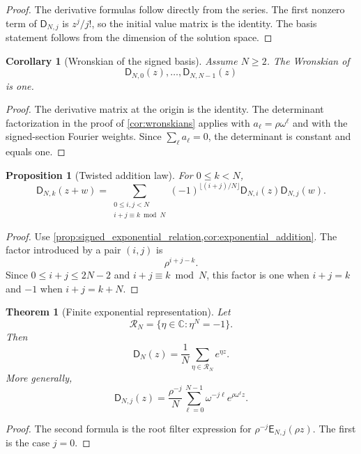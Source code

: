 \documentclass[11pt]{article}
\newtheorem{theorem}{Theorem}[section]
\newtheorem{proposition}[proposition]{Proposition}
\newtheorem{corollary}[corollary]{Corollary}
\theoremstyle{definition}
\theoremstyle{remark}
\newcommand{\CC}{\mathbb C}
\newcommand{\Rcal}{\mathcal R}
\newcommand{\Dfun}{\mathsf D}
\newcommand{\Efun}{\mathsf E}
\begin{document}
\begin{proof}
The derivative formulas follow directly from the series.  The first nonzero term of $\Dfun_{N,j}$ is $z^j/j!$, so the initial value matrix is the identity.  The basis statement follows from the dimension of the solution space.
\end{proof}

\begin{corollary}[Wronskian of the signed basis]\label{cor:signed_wronskian}
Assume $N\geq2$. The Wronskian of
\[
\Dfun_{N,0}(z),\ldots,\Dfun_{N,N-1}(z)
\]
is one.
\end{corollary}

\begin{proof}
The derivative matrix at the origin is the identity. The determinant
factorization in the proof of \cref{cor:wronskians} applies with
$a_\ell=\rho\omega^\ell$ and with the signed-section Fourier weights.
Since $\sum_\ell a_\ell=0$, the determinant is constant and equals one.
\end{proof}


\begin{proposition}[Twisted addition law]\label{prop:signed_addition}
For $0\leq k<N$,
\[
\Dfun_{N,k}(z+w)
=
\sum_{\substack{0\leq i,j<N\\ i+j\equiv k\bmod N}}
(-1)^{\lfloor(i+j)/N\rfloor}
\Dfun_{N,i}(z)\Dfun_{N,j}(w).
\]
\end{proposition}

\begin{proof}
Use \cref{prop:signed_exponential_relation,cor:exponential_addition}.  The factor introduced by a pair $(i,j)$ is
\[
\rho^{i+j-k}.
\]
Since $0\leq i+j\leq2N-2$ and $i+j\equiv k\bmod N$, this factor is one when $i+j=k$ and $-1$ when $i+j=k+N$.
\end{proof}

\begin{theorem}[Finite exponential representation]\label{thm:finite_exponential_representation}
Let
\[
\Rcal_N=\{\eta\in\CC\mathrel{:}\eta^N=-1\}.
\]
Then
\[
\Dfun_N(z)
=
\frac1N\sum_{\eta\in\Rcal_N}e^{\eta z}.
\]
More generally,
\[
\Dfun_{N,j}(z)
=
\frac{\rho^{-j}}N
\sum_{\ell=0}^{N-1}
\omega^{-j\ell}e^{\rho\omega^\ell z}.
\]
\end{theorem}

\begin{proof}
The second formula is the root filter expression for $\rho^{-j}\Efun_{N,j}(\rho z)$.  The first is the case $j=0$.
\end{proof}
\end{document}
